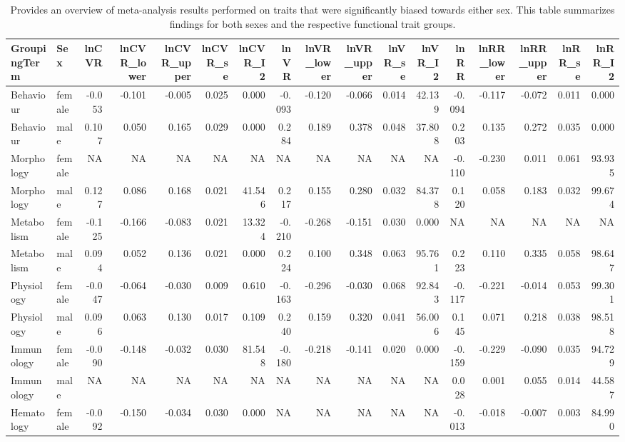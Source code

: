 \documentclass[]{article}
\begin{document}
\begin{table}

\caption{\label{tab:unnamed-chunk-6}Provides an overview of meta-analysis results performed on traits that were significantly biased towards either sex. This table summarizes findings for both sexes and the respective functional trait groups.}
\centering
\begin{tabular}[t]{l|l|r|r|r|r|r|r|r|r|r|r|r|r|r|r|r}
\hline
GroupingTerm & Sex & lnCVR & lnCVR\_lower & lnCVR\_upper & lnCVR\_se & lnCVR\_I2 & lnVR & lnVR\_lower & lnVR\_upper & lnVR\_se & lnVR\_I2 & lnRR & lnRR\_lower & lnRR\_upper & lnRR\_se & lnRR\_I2\\
\hline
Behaviour & female & -0.053 & -0.101 & -0.005 & 0.025 & 0.000 & -0.093 & -0.120 & -0.066 & 0.014 & 42.139 & -0.094 & -0.117 & -0.072 & 0.011 & 0.000\\
\hline
Behaviour & male & 0.107 & 0.050 & 0.165 & 0.029 & 0.000 & 0.284 & 0.189 & 0.378 & 0.048 & 37.808 & 0.203 & 0.135 & 0.272 & 0.035 & 0.000\\
\hline
Morphology & female & NA & NA & NA & NA & NA & NA & NA & NA & NA & NA & -0.110 & -0.230 & 0.011 & 0.061 & 93.935\\
\hline
Morphology & male & 0.127 & 0.086 & 0.168 & 0.021 & 41.546 & 0.217 & 0.155 & 0.280 & 0.032 & 84.378 & 0.120 & 0.058 & 0.183 & 0.032 & 99.674\\
\hline
Metabolism & female & -0.125 & -0.166 & -0.083 & 0.021 & 13.324 & -0.210 & -0.268 & -0.151 & 0.030 & 0.000 & NA & NA & NA & NA & NA\\
\hline
Metabolism & male & 0.094 & 0.052 & 0.136 & 0.021 & 0.000 & 0.224 & 0.100 & 0.348 & 0.063 & 95.761 & 0.223 & 0.110 & 0.335 & 0.058 & 98.647\\
\hline
Physiology & female & -0.047 & -0.064 & -0.030 & 0.009 & 0.610 & -0.163 & -0.296 & -0.030 & 0.068 & 92.843 & -0.117 & -0.221 & -0.014 & 0.053 & 99.301\\
\hline
Physiology & male & 0.096 & 0.063 & 0.130 & 0.017 & 0.109 & 0.240 & 0.159 & 0.320 & 0.041 & 56.006 & 0.145 & 0.071 & 0.218 & 0.038 & 98.518\\
\hline
Immunology & female & -0.090 & -0.148 & -0.032 & 0.030 & 81.548 & -0.180 & -0.218 & -0.141 & 0.020 & 0.000 & -0.159 & -0.229 & -0.090 & 0.035 & 94.729\\
\hline
Immunology & male & NA & NA & NA & NA & NA & NA & NA & NA & NA & NA & 0.028 & 0.001 & 0.055 & 0.014 & 44.587\\
\hline
Hematology & female & -0.092 & -0.150 & -0.034 & 0.030 & 0.000 & NA & NA & NA & NA & NA & -0.013 & -0.018 & -0.007 & 0.003 & 84.990\\

\end{tabular}
\end{table}
\end{document}
